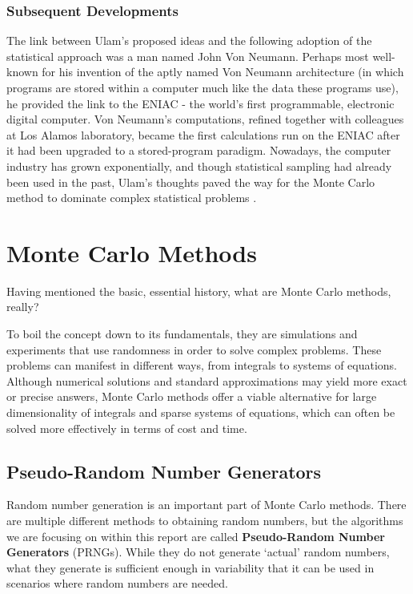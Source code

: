 \documentclass[11pt,a4paper]{article}
\begin{document}
        \subsubsection{Subsequent Developments}
            The link between Ulam's proposed ideas and the following adoption of the statistical approach was a man named John Von Neumann.
            Perhaps most well-known for his invention of the aptly named Von Neumann architecture (in which programs are stored within a computer much like the data these programs use),
            he provided the link to the ENIAC - the world’s first programmable, electronic digital computer.
            Von Neumann's computations, refined together with colleagues at Los Alamos laboratory, became the first calculations run on the ENIAC after it had been upgraded to a stored-program paradigm.
            Nowadays, the computer industry has grown exponentially, and though statistical sampling had already been used in the past, Ulam's thoughts paved the way for the Monte Carlo method to dominate complex statistical problems \citep{Summerscales23}.             




\newpage
\section{Monte Carlo Methods}

    Having mentioned the basic, essential history, what are Monte Carlo methods, really?
    
    To boil the concept down to its fundamentals, they are simulations and experiments that use randomness in order to solve complex problems.
    These problems can manifest in different ways, from integrals to systems of equations.
    Although numerical solutions and standard approximations may yield more exact or precise answers, Monte Carlo methods offer a viable alternative for large dimensionality of integrals and sparse systems of equations, which can often be solved more effectively in terms of cost and time.


    \subsection{Pseudo-Random Number Generators}
        Random number generation is an important part of Monte Carlo methods. 
        There are multiple different methods to obtaining random numbers, but the algorithms we are focusing on within this report are called \textbf{Pseudo-Random Number Generators} (PRNGs).
        While they do not generate `actual' random numbers, what they generate is sufficient enough in variability that it can be used in scenarios where random numbers are needed.
\end{document}
